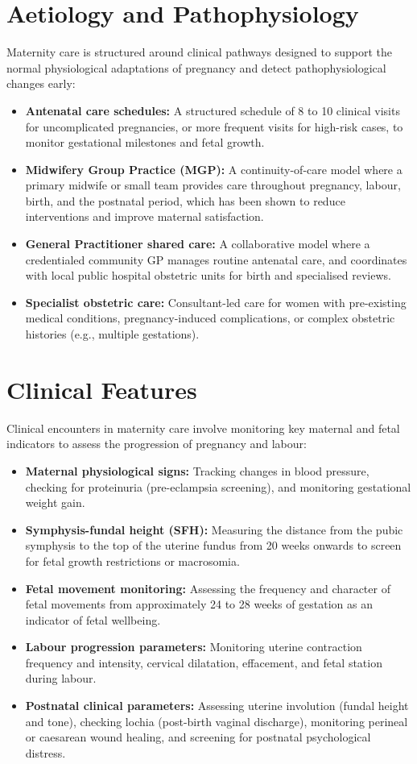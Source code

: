 \section*{Aetiology and Pathophysiology}
Maternity care is structured around clinical pathways designed to support the normal physiological adaptations of pregnancy and detect pathophysiological changes early:
\begin{itemize}
    \item \textbf{Antenatal care schedules:} A structured schedule of 8 to 10 clinical visits for uncomplicated pregnancies, or more frequent visits for high-risk cases, to monitor gestational milestones and fetal growth.
    \item \textbf{Midwifery Group Practice (MGP):} A continuity-of-care model where a primary midwife or small team provides care throughout pregnancy, labour, birth, and the postnatal period, which has been shown to reduce interventions and improve maternal satisfaction.
    \item \textbf{General Practitioner shared care:} A collaborative model where a credentialed community GP manages routine antenatal care, and coordinates with local public hospital obstetric units for birth and specialised reviews.
    \item \textbf{Specialist obstetric care:} Consultant-led care for women with pre-existing medical conditions, pregnancy-induced complications, or complex obstetric histories (e.g., multiple gestations).
\end{itemize}

\section*{Clinical Features}
Clinical encounters in maternity care involve monitoring key maternal and fetal indicators to assess the progression of pregnancy and labour:
\begin{itemize}
    \item \textbf{Maternal physiological signs:} Tracking changes in blood pressure, checking for proteinuria (pre-eclampsia screening), and monitoring gestational weight gain.
    \item \textbf{Symphysis-fundal height (SFH):} Measuring the distance from the pubic symphysis to the top of the uterine fundus from 20 weeks onwards to screen for fetal growth restrictions or macrosomia.
    \item \textbf{Fetal movement monitoring:} Assessing the frequency and character of fetal movements from approximately 24 to 28 weeks of gestation as an indicator of fetal wellbeing.
    \item \textbf{Labour progression parameters:} Monitoring uterine contraction frequency and intensity, cervical dilatation, effacement, and fetal station during labour.
    \item \textbf{Postnatal clinical parameters:} Assessing uterine involution (fundal height and tone), checking lochia (post-birth vaginal discharge), monitoring perineal or caesarean wound healing, and screening for postnatal psychological distress.
\end{itemize}

